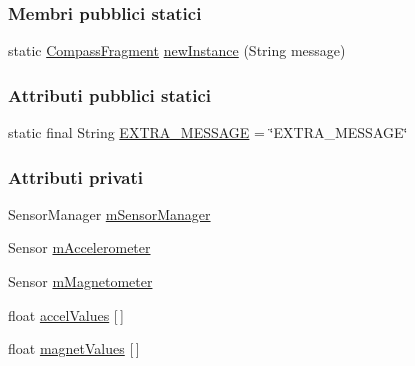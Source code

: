 \subsubsection*{Membri pubblici statici}
\begin{DoxyCompactItemize}
\item 
static \hyperlink{classit_1_1unibo_1_1torsello_1_1bluetoothpositioning_1_1fragment_1_1oldFragment_1_1CompassFragment}{Compass\+Fragment} \hyperlink{classit_1_1unibo_1_1torsello_1_1bluetoothpositioning_1_1fragment_1_1oldFragment_1_1CompassFragment_a679cc6d37eb185a303b003939ea92b7b_a679cc6d37eb185a303b003939ea92b7b}{new\+Instance} (String message)
\end{DoxyCompactItemize}
\subsubsection*{Attributi pubblici statici}
\begin{DoxyCompactItemize}
\item 
static final String \hyperlink{classit_1_1unibo_1_1torsello_1_1bluetoothpositioning_1_1fragment_1_1oldFragment_1_1CompassFragment_aa984dd2435af48bbcb21cafa07f8e16a_aa984dd2435af48bbcb21cafa07f8e16a}{E\+X\+T\+R\+A\+\_\+\+M\+E\+S\+S\+A\+GE} = \char`\"{}E\+X\+T\+R\+A\+\_\+\+M\+E\+S\+S\+A\+GE\char`\"{}
\end{DoxyCompactItemize}
\subsubsection*{Attributi privati}
\begin{DoxyCompactItemize}
\item 
Sensor\+Manager \hyperlink{classit_1_1unibo_1_1torsello_1_1bluetoothpositioning_1_1fragment_1_1oldFragment_1_1CompassFragment_a9006c75f41300481eaa95c6bb02143e3_a9006c75f41300481eaa95c6bb02143e3}{m\+Sensor\+Manager}
\item 
Sensor \hyperlink{classit_1_1unibo_1_1torsello_1_1bluetoothpositioning_1_1fragment_1_1oldFragment_1_1CompassFragment_a9f521d80f0f7b0e89bb26951c2e463c0_a9f521d80f0f7b0e89bb26951c2e463c0}{m\+Accelerometer}
\item 
Sensor \hyperlink{classit_1_1unibo_1_1torsello_1_1bluetoothpositioning_1_1fragment_1_1oldFragment_1_1CompassFragment_a9e3cd0081d45a26094a8395fe67736c6_a9e3cd0081d45a26094a8395fe67736c6}{m\+Magnetometer}
\item 
float \hyperlink{classit_1_1unibo_1_1torsello_1_1bluetoothpositioning_1_1fragment_1_1oldFragment_1_1CompassFragment_a001321cd7ff2955f1ab00b840a477281_a001321cd7ff2955f1ab00b840a477281}{accel\+Values} \mbox{[}$\,$\mbox{]}
\item 
float \hyperlink{classit_1_1unibo_1_1torsello_1_1bluetoothpositioning_1_1fragment_1_1oldFragment_1_1CompassFragment_a202e7056f07b065dd96894de79faa0a4_a202e7056f07b065dd96894de79faa0a4}{magnet\+Values} \mbox{[}$\,$\mbox{]}
\end{DoxyCompactItemize}



